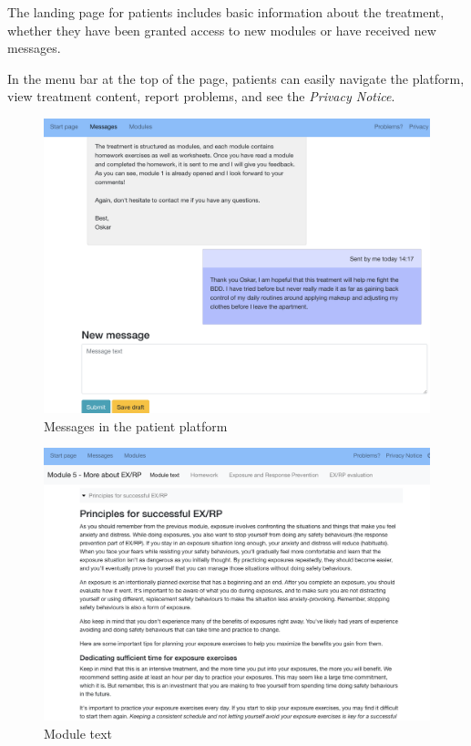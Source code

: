 \documentclass[]{book}
\begin{document}
The landing page for patients includes basic information about the treatment, whether they have been granted access to new modules or have received new messages.

In the menu bar at the top of the page, patients can easily navigate the platform, view treatment content, report problems, and see the \emph{Privacy Notice}.

\begin{figure}
\centering
\includegraphics{images/patient-messages.png}
\caption{Messages in the patient platform}
\end{figure}

\begin{figure}
\centering
\includegraphics{images/patient-moduletext.png}
\caption{Module text}
\end{figure}
\end{document}

